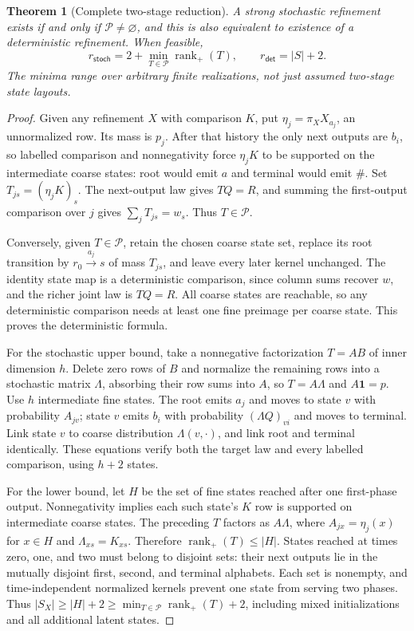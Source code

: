 \documentclass[11pt]{article}
\newtheorem{theorem}{Theorem}[section]
\newcommand{\one}{\mathbf{1}}
\begin{document}
\begin{theorem}[Complete two-stage reduction]
A strong stochastic refinement exists if and only if $\mathcal P\ne\varnothing$, and this is also equivalent to existence of a deterministic refinement. When feasible,
\begin{equation}
 r_{\mathsf{stoch}}=2+\min_{T\in\mathcal P}\operatorname{rank}_+(T),
 \qquad r_{\mathsf{det}}=|S|+2.
 \label{eq:twostage-cost}
\end{equation}
The minima range over arbitrary finite realizations, not just assumed two-stage state layouts.
\end{theorem}
\begin{proof}
Given any refinement $X$ with comparison $K$, put $\eta_j=\pi_XX_{a_j}$, an unnormalized row. Its mass is $p_j$. After that history the only next outputs are $b_i$, so labelled comparison and nonnegativity force $\eta_jK$ to be supported on the intermediate coarse states: root would emit $a$ and terminal would emit $\#$. Set $T_{js}=(\eta_jK)_s$. The next-output law gives $TQ=R$, and summing the first-output comparison over $j$ gives $\sum_jT_{js}=w_s$. Thus $T\in\mathcal P$.

Conversely, given $T\in\mathcal P$, retain the chosen coarse state set, replace its root transition by $r_0\xrightarrow{a_j}s$ of mass $T_{js}$, and leave every later kernel unchanged. The identity state map is a deterministic comparison, since column sums recover $w$, and the richer joint law is $TQ=R$. All coarse states are reachable, so any deterministic comparison needs at least one fine preimage per coarse state. This proves the deterministic formula.

For the stochastic upper bound, take a nonnegative factorization $T=AB$ of inner dimension $h$. Delete zero rows of $B$ and normalize the remaining rows into a stochastic matrix $\Lambda$, absorbing their row sums into $A$, so $T=A\Lambda$ and $A\one=p$. Use $h$ intermediate fine states. The root emits $a_j$ and moves to state $v$ with probability $A_{jv}$; state $v$ emits $b_i$ with probability $(\Lambda Q)_{vi}$ and moves to terminal. Link state $v$ to coarse distribution $\Lambda(v,\cdot)$, and link root and terminal identically. These equations verify both the target law and every labelled comparison, using $h+2$ states.

For the lower bound, let $H$ be the set of fine states reached after one first-phase output. Nonnegativity implies each such state's $K$ row is supported on intermediate coarse states. The preceding $T$ factors as $A\Lambda$, where $A_{jx}=\eta_j(x)$ for $x\in H$ and $\Lambda_{xs}=K_{xs}$. Therefore $\operatorname{rank}_+(T)\leq|H|$. States reached at times zero, one, and two must belong to disjoint sets: their next outputs lie in the mutually disjoint first, second, and terminal alphabets. Each set is nonempty, and time-independent normalized kernels prevent one state from serving two phases. Thus $|S_X|\geq|H|+2\geq\min_{T\in\mathcal P}\operatorname{rank}_+(T)+2$, including mixed initializations and all additional latent states.
\end{proof}
\end{document}

